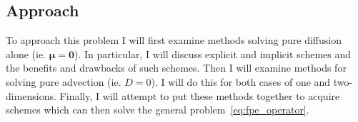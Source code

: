 \documentclass[12pt]{article}
\begin{document}
\subsection{Approach}

To approach this problem I will first examine methods solving pure diffusion alone (ie. $\bm{\mu} = \bm{0}$). In particular, I will discuss explicit and implicit schemes and the benefits and drawbacks of such schemes. Then I will examine methods for solving pure advection (ie. $D = 0$). I will do this for both cases of one and two-dimensions. Finally, I will attempt to put these methods together to acquire schemes which can then solve the general problem~\eqref{eq:fpe_operator}. 
\end{document}
